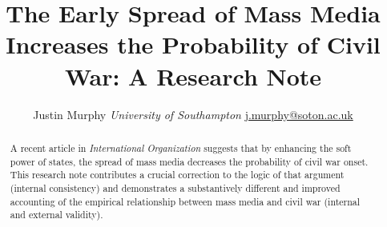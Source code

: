 \documentclass[11pt,article,oneside]{memoir}
\title{The Early Spread of Mass Media Increases the Probability of Civil War: A
Research Note}
\author{\Large Justin Murphy\vspace{0.05in} \newline\normalsize\emph{University of Southampton} \newline\footnotesize \url{j.murphy@soton.ac.uk}\vspace*{0.2in}\newline }
\date{}
\begin{document}
  
\setsansfont[Mapping=tex-text]{Gill Sans} 
\setmonofont[Mapping=tex-text,Scale=0.8]{Consolas}
\pagestyle{kjh}

\singlespacing


\maketitle



\vspace{-4ex}
\begin{abstract}

\noindent A recent article in \emph{International Organization} suggests that by
enhancing the soft power of states, the spread of mass media decreases
the probability of civil war onset. This research note contributes a
crucial correction to the logic of that argument (internal consistency)
and demonstrates a substantively different and improved accounting of
the empirical relationship between mass media and civil war (internal
and external validity).

\end{abstract}

\newpage


\onehalfspacing
\end{document}
